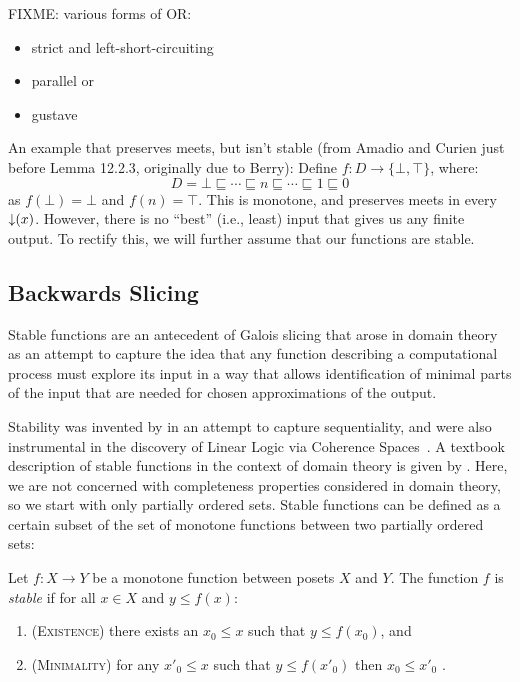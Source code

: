 \begin{example}
  FIXME: various forms of OR:
  \begin{itemize}
  \item strict and left-short-circuiting
  \item parallel or
  \item gustave
  \end{itemize}
\end{example}

\begin{example}
  An example that preserves meets, but isn't stable (from Amadio and
  Curien just before Lemma 12.2.3, originally due to Berry): Define
  $f : D \to \{\bot, \top\}$, where:
  \begin{displaymath}
    D = \bot \sqsubseteq \cdots \sqsubseteq n \sqsubseteq \cdots \sqsubseteq 1 \sqsubseteq 0
  \end{displaymath}
  as $f(\bot) = \bot$ and $f(n) = \top$. This is monotone, and
  preserves meets in every $\mathop{\downarrow}(x)$. However, there is no
  ``best'' (i.e., least) input that gives us any finite output. To
  rectify this, we will further assume that our functions are stable.
\end{example}

\subsection{Backwards Slicing}

Stable functions are an antecedent of Galois slicing that arose in
domain theory as an attempt to capture the idea that any function
describing a computational process must explore its input in a way
that allows identification of minimal parts of the input that are
needed for chosen approximations of the output.

Stability was invented by \citet{berry79} in an attempt to capture
sequentiality, and were also instrumental in the discovery of Linear
Logic via Coherence Spaces~\citep{girard}. A textbook description of
stable functions in the context of domain theory is given by
\citet[Chapter 12]{amadio-curien}. Here, we are not
concerned with completeness properties considered in domain theory, so
we start with only partially ordered sets. Stable functions can be
defined as a certain subset of the set of monotone functions between
two partially ordered sets:

\begin{definition}
  Let $f : X \to Y$ be a monotone function between posets $X$ and
  $Y$. The function $f$ is \emph{stable} if for all $x \in X$ and
  $y \leq f(x)$:
  \begin{enumerate}
  \item (\textsc{Existence}) there exists an $x_0 \leq x$ such that $y \leq f(x_0)$, and
  \item (\textsc{Minimality}) for any $x'_0 \leq x$ such that $y \leq f(x'_0)$ then
    $x_0 \leq x'_0$ .
  \end{enumerate}
\end{definition}


